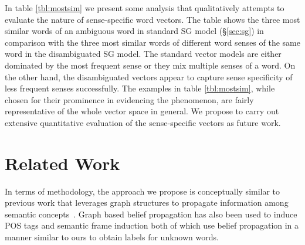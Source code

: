 \documentclass[11pt]{article}
\begin{document}
In table \ref{tbl:mostsim} we present some analysis that qualitatively attempts to evaluate the nature of 
sense-specific word vectors. The table shows the three most similar words of an ambiguous word in standard SG model (\S\ref{sec:sg}) in comparison with the three most similar words of different word senses of the same word in the disambiguated SG model. 
The standard vector models %
are either dominated by the most frequent sense or they mix multiple senses of a word. 
On the other hand, the disambiguated vectors appear to capture sense specificity of less frequent senses successfully. The examples in table \ref{tbl:mostsim}, while chosen for their prominence in evidencing the phenomenon, are fairly representative of the whole vector space in general. We propose to carry out
extensive quantitative evaluation of the sense-specific vectors as future work.

\section{Related Work}

In terms of methodology, the approach we propose is conceptually similar to previous work that leverages graph 
structures to propagate information among semantic concepts~\cite{Zhu:2005:SLG:1104523,10.1109/TPAMI.2007.70765}. 
Graph based belief propagation has also been used to induce POS tags
\cite{Subramanya:2010:EGS:1870658.1870675,das-petrov:2011:ACL-HLT2011}
and semantic frame induction \cite{das-smith:2011:ACL-HLT2011} both of
which use belief propagation in a manner similar to ours to obtain
labels for unknown words.
\end{document}
